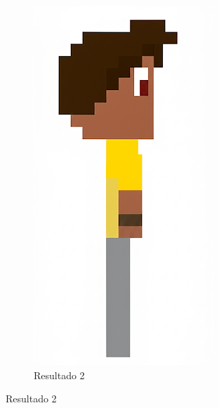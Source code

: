 \begin{figure}[htbp]
    \begin{subfigure}{0.45 \linewidth}
        \centering
        \includegraphics[width=0.7\linewidth]{figs/geminiPro/chat5/tela3_res2.PNG}
        \caption{\small Resultado 2}
        \label{fig:geminiProSideMelhorDescricao2}
    \end{subfigure}
\end{figure}

